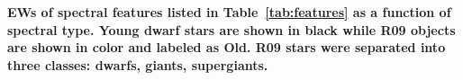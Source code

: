 {\bf EWs of spectral features listed in Table~\ref{tab:features} as a function of spectral type.  Young dwarf stars are shown in black while R09 objects are shown in color and labeled as Old.  R09 stars were separated into three classes: dwarfs, giants, supergiants.\label{fig:EW-obs-R09}}